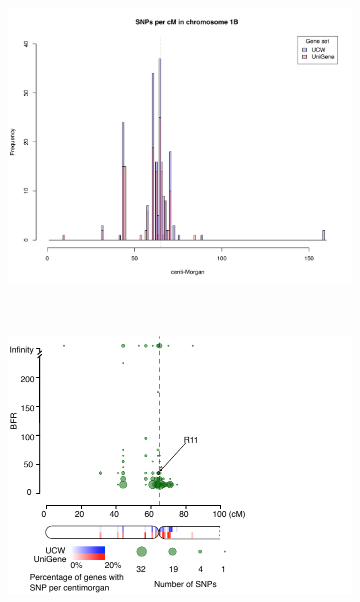 \begin{figure}
  \centering
  \begin{subfigure}{0.6\textwidth}
  \caption{}
   \label{fig:yr15:snpsBFR6Chr1B}
   \includegraphics[width=1\textwidth]{Yr15/Figures/mapping/snpsBFR6crh1B.pdf}
  \end{subfigure}
  ~
  \begin{subfigure}{0.35\textwidth}
  \caption{}
   \label{fig:yr15:BFRValues1BS}
   \includegraphics[width=1\textwidth]{Yr15/Figures/mapping/BFRValues1BS.pdf}
  \end{subfigure}

\end{figure}
